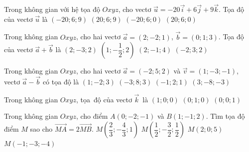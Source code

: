 \begin{ex}%
	Trong không  gian với hệ tọa độ $Oxyz$, cho vectơ $\overrightarrow{u}=-20\overrightarrow{i}+6\overrightarrow{j}+9\overrightarrow{k}$. Tọa độ của vectơ $\overrightarrow{u}$ là
	\choice 
		 {\True$(-20;6;9)$}
		 {$(20;6;9)$}
		{$(-20;6;0)$} 
		 {$(20;6;0)$}
\end{ex}

\begin{ex}%
	Trong không gian $Oxyz$, cho hai vectơ $\overrightarrow{a}=(2;-2;1)$, $\overrightarrow{b}=(0;1;3)$. Tọa độ của vectơ  $\overrightarrow{a}+\overrightarrow{b}$ là
	 \choice
		{$(2;-3;2)$} 
		 {$\left(1;-\dfrac{1}{2};2\right)$}
		{\True $(2;-1;4)$} 
		 {$(-2;3;2)$}
\end{ex}

\begin{ex}%
	Trong không  gian $Oxyz$, cho hai vectơ $\overrightarrow{a} = (-2;5;2)$ và $\overrightarrow{v} = (1;-3;-1)$, vectơ $\overrightarrow{a} - \overrightarrow{b}$ có tọa độ là
	 \choice
		 {$(1;-2;3)$}
		 {\True $(-3;8;3)$}
		 {$(-1;2;1)$}
		{$(3;-8;-3)$} 
\end{ex}

\begin{ex}%
	Trong không gian $Oxyz$, tọa~độ của  vectơ $\overrightarrow{k}$~là
		{$(1; 0;  0)$}
		{$(0;  1; 0)$}
		 {\True $(0; 0; 1)$}
\end{ex}

\begin{ex}%
	Trong không gian $Oxyz$, cho điểm $A(0;-2;-1)$  và $B(1;-1;2)$. Tìm tọa độ điểm $M$ sao cho $\overrightarrow{MA}=2\overrightarrow{MB}$.
	 \choice
		 {$M\left(\dfrac{2}{3};-\dfrac{4}{3};1\right)$}
		 {$M\left(\dfrac{1}{2};-\dfrac{3}{2};\dfrac{1}{2}\right)$}
		 {\True $M(2;0;5)$}
		 {$M(-1;-3;-4)$}
\end{ex}

